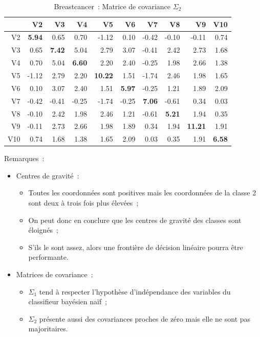 \documentclass[a4paper,10pt]{report}
\begin{document}
\begin{table}[H]
	\centering
	\begin{tabular}{r|rrrrrrrrr}
		& V2 & V3 & V4 & V5 & V6 & V7 & V8 & V9 & V10 \\ 
		\hline
		V2 & \textbf{5.94} & 0.65 & 0.70 & -1.12 & 0.10 & -0.42 & -0.10 & -0.11 & 0.74 \\ 
		V3 & 0.65 & \textbf{7.42} & 5.04 & 2.79 & 3.07 & -0.41 & 2.42 & 2.73 & 1.68 \\ 
		V4 & 0.70 & 5.04 & \textbf{6.60} & 2.20 & 2.40 & -0.25 & 1.98 & 2.66 & 1.38 \\ 
		V5 & -1.12 & 2.79 & 2.20 & \textbf{10.22} & 1.51 & -1.74 & 2.46 & 1.98 & 1.65 \\ 
		V6 & 0.10 & 3.07 & 2.40 & 1.51 & \textbf{5.97} & -0.25 & 1.21 & 1.89 & 2.09 \\ 
		V7 & -0.42 & -0.41 & -0.25 & -1.74 & -0.25 & \textbf{7.06} & -0.61 & 0.34 & 0.03 \\ 
		V8 & -0.10 & 2.42 & 1.98 & 2.46 & 1.21 & -0.61 & \textbf{5.21} & 1.94 & 0.35 \\ 
		V9 & -0.11 & 2.73 & 2.66 & 1.98 & 1.89 & 0.34 & 1.94 & \textbf{11.21} & 1.91 \\ 
		V10 & 0.74 & 1.68 & 1.38 & 1.65 & 2.09 & 0.03 & 0.35 & 1.91 & \textbf{6.58} \\ 
	\end{tabular}
	\caption{Breastcancer~: Matrice de covariance $\Sigma_{2}$}
\end{table}



Remarques~:
\begin{itemize}
	\item Centres de gravité~:
	\begin{itemize}
		\item Toutes les coordonnées sont positives mais les coordonnées de la classe 2 sont deux à trois fois plus élevées~;
		\item On peut donc en conclure que les centres de gravité des classes sont éloignés~;
		\item S'ils le sont assez, alors une frontière de décision linéaire pourra être performante.
	\end{itemize}
	\item Matrices de covariance~:
	\begin{itemize}
		\item $\Sigma_{1}$ tend à respecter l'hypothèse d'indépendance des variables du classifieur bayésien naïf~;
		\item $\Sigma_{2}$ présente aussi des covariances proches de zéro mais elle ne sont pas majoritaires.
	\end{itemize}
\end{itemize}
\end{document}

